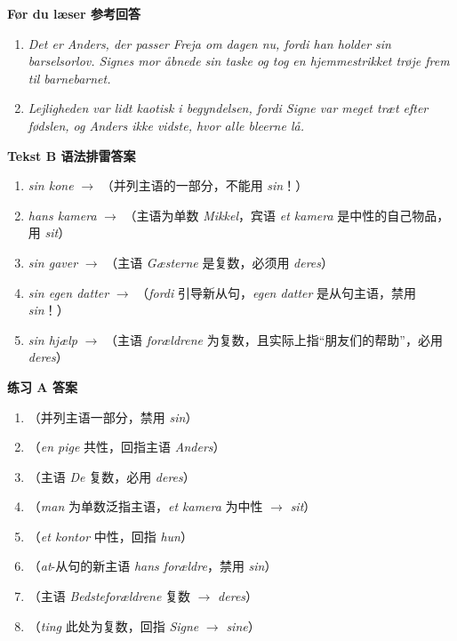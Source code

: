 \begin{answerbox}
\textbf{Før du læser 参考回答}
\begin{enumerate}
  \item \textit{Det er Anders, der passer Freja om dagen nu, fordi han holder sin barselsorlov. Signes mor åbnede sin taske og tog en hjemmestrikket trøje frem til barnebarnet.}
  \item \textit{Lejligheden var lidt kaotisk i begyndelsen, fordi Signe var meget træt efter fødslen, og Anders ikke vidste, hvor alle bleerne lå.}
\end{enumerate}

\textbf{Tekst B 语法排雷答案}
\begin{enumerate}
  \item[(1)] \textit{sin kone} $\rightarrow$ （并列主语的一部分，不能用 \textit{sin}！）
  \item[(2)] \textit{hans kamera} $\rightarrow$ （主语为单数 \textit{Mikkel}，宾语 \textit{et kamera} 是中性的自己物品，用 \textit{sit}）
  \item[(3)] \textit{sin gaver} $\rightarrow$ （主语 \textit{Gæsterne} 是复数，必须用 \textit{deres}）
  \item[(4)] \textit{sin egen datter} $\rightarrow$ （\textit{fordi} 引导新从句，\textit{egen datter} 是从句主语，禁用 \textit{sin}！）
  \item[(5)] \textit{sin hjælp} $\rightarrow$ （主语 \textit{forældrene} 为复数，且实际上指“朋友们的帮助”，必用 \textit{deres}）
\end{enumerate}

\textbf{练习 A 答案}
\begin{enumerate}
  \item {}（并列主语一部分，禁用 \textit{sin}）
  \item {}（\textit{en pige} 共性，回指主语 \textit{Anders}）
  \item {}（主语 \textit{De} 复数，必用 \textit{deres}）
  \item {}（\textit{man} 为单数泛指主语，\textit{et kamera} 为中性 $\rightarrow$ \textit{sit}）
  \item {}（\textit{et kontor} 中性，回指 \textit{hun}）
  \item {}（\textit{at}-从句的新主语 \textit{hans forældre}，禁用 \textit{sin}）
  \item {}（主语 \textit{Bedsteforældrene} 复数 $\rightarrow$ \textit{deres}）
  \item {}（\textit{ting} 此处为复数，回指 \textit{Signe} $\rightarrow$ \textit{sine}）
\end{enumerate}


\end{answerbox}
